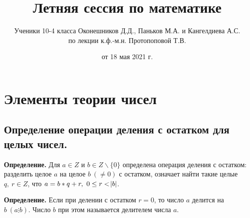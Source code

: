 \documentclass{article}
\begin{document}
\title{Летняя сессия по математике}
    \author{Ученики 10-4 класса Оконешников Д.Д., Паньков М.А. и Кангелдиева А.С. \\по лекции к.ф.-м.н. Протопоповой Т.В.}
    \date{от 18 мая 2021 г.}
    \maketitle
	
    \tableofcontents
	\thispagestyle{empty}
	\setcounter{tocdepth}{5}
	\newpage
    
    \section{Элементы теории чисел}
    	\subsection{Определение операции деления с остатком для целых чисел.}
    		\textbf{Определение.} Для \( a \in Z \) и \( b \in Z \backslash \{0\} \) определена операция деления с остатком: разделить целое \( a \) на целое \(b\ (\neq 0) \) с остатком, 
			означает найти такие целые \( q,\ r \in Z \), что \(a=b*q+r,\ 0 \leq r < \abs{b} \).
            
  			\textbf{Определение.} Если при делении с остатком \( r = 0 \), то число \( a \) делится на \( b\ (a \vdots b) \). Число \( b \) при этом называется делителем числа \( a \).	
            
\end{document}
